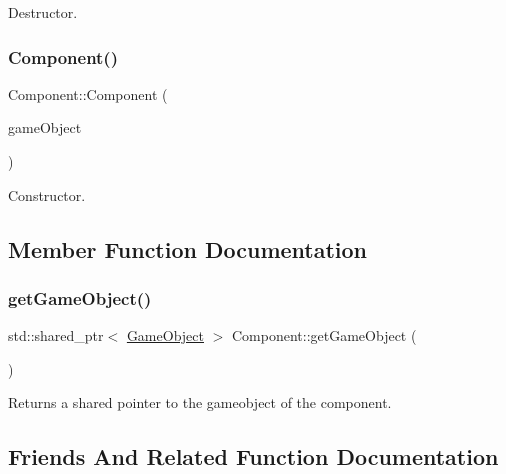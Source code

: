 Destructor. 

\hypertarget{class_mason_1_1_component_a19f394f7e3e940e7fc01d18d6a762d46}{}\label{class_mason_1_1_component_a19f394f7e3e940e7fc01d18d6a762d46} 
\subsubsection{\texorpdfstring{Component()}{Component()}}
{\footnotesize\ttfamily Component\+::\+Component (\begin{DoxyParamCaption}\item[{std\+::shared\+\_\+ptr$<$ \hyperlink{class_mason_1_1_game_object}{Game\+Object} $>$}]{game\+Object }\end{DoxyParamCaption})\hspace{0.3cm}{\ttfamily [protected]}}



Constructor. 



\subsection{Member Function Documentation}
\hypertarget{class_mason_1_1_component_a6c96ba73e4added598bfa975e000a3ea}{}\label{class_mason_1_1_component_a6c96ba73e4added598bfa975e000a3ea} 
\subsubsection{\texorpdfstring{get\+Game\+Object()}{getGameObject()}}
{\footnotesize\ttfamily std\+::shared\+\_\+ptr$<$ \hyperlink{class_mason_1_1_game_object}{Game\+Object} $>$ Component\+::get\+Game\+Object (\begin{DoxyParamCaption}{ }\end{DoxyParamCaption})}



Returns a shared pointer to the gameobject of the component. 



\subsection{Friends And Related Function Documentation}
\hypertarget{class_mason_1_1_component_a00df87c957d8f7ee0fc51f07a0542f4a}{}\label{class_mason_1_1_component_a00df87c957d8f7ee0fc51f07a0542f4a} 
